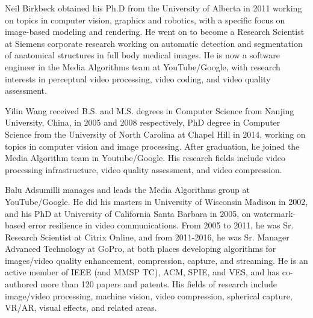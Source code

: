 \documentclass[journal]{IEEEtran}
\begin{document}
\begin{IEEEbiography}
{Neil Birkbeck} obtained his Ph.D from the University of Alberta in 2011 working on topics in computer vision, graphics and robotics, with a specific focus on image-based modeling and rendering. He went on to become a Research Scientist at Siemens corporate research working on automatic detection and segmentation of anatomical structures in full body medical images. He is now a software engineer in the Media Algorithms team at YouTube/Google, with research interests in perceptual video processing, video coding, and video quality assessment.
\end{IEEEbiography}

\begin{IEEEbiography}
{Yilin Wang}
received B.S. and M.S. degrees in Computer Science from Nanjing University, China, in 2005 and 2008 respectively, PhD degree in Computer Science from the University of North Carolina at Chapel Hill in 2014, working on topics in computer vision and image processing. After graduation, he joined the Media Algorithm team in Youtube/Google. His research fields include video processing infrastructure, video quality assessment, and video compression.
\end{IEEEbiography}

\begin{IEEEbiography}
{Balu Adsumilli} manages and leads the Media Algorithms group at YouTube/Google. He did his masters in University of Wisconsin Madison in 2002, and his PhD at University of California Santa Barbara in 2005, on watermark-based error resilience in video communications. From 2005 to 2011, he was Sr. Research Scientist at Citrix Online, and from 2011-2016, he was Sr. Manager Advanced Technology at GoPro, at both places developing algorithms for images/video quality enhancement, compression, capture, and streaming. He is an active member of IEEE (and MMSP TC), ACM, SPIE, and VES, and has co-authored more than 120 papers and patents. His fields of research include image/video processing, machine vision, video compression, spherical capture, VR/AR, visual effects, and related areas.
\end{IEEEbiography}
\end{document}
